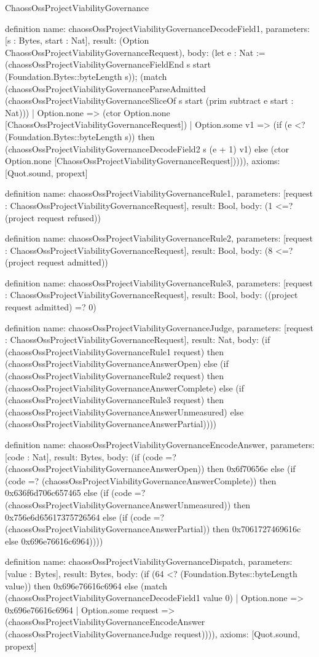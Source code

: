 \begin{lexlean}{ChaossOssProjectViabilityGovernance}
\begin{semanticmodule}
definition{
  name: chaossOssProjectViabilityGovernanceDecodeField1,
  parameters: [s : Bytes, start : Nat],
  result: (Option ChaossOssProjectViabilityGovernanceRequest),
  body: (let e : Nat := (chaossOssProjectViabilityGovernanceFieldEnd s start (Foundation.Bytes::byteLength s)); (match (chaossOssProjectViabilityGovernanceParseAdmitted (chaossOssProjectViabilityGovernanceSliceOf s start (prim subtract e start : Nat)))
    | Option.none => (ctor Option.none [ChaossOssProjectViabilityGovernanceRequest])
    | Option.some v1 => (if (e <? (Foundation.Bytes::byteLength s)) then (chaossOssProjectViabilityGovernanceDecodeField2 s (e + 1) v1) else (ctor Option.none [ChaossOssProjectViabilityGovernanceRequest])))),
  axioms: [Quot.sound, propext]
}

definition{
  name: chaossOssProjectViabilityGovernanceRule1,
  parameters: [request : ChaossOssProjectViabilityGovernanceRequest],
  result: Bool,
  body: (1 <=? (project request refused))
}

definition{
  name: chaossOssProjectViabilityGovernanceRule2,
  parameters: [request : ChaossOssProjectViabilityGovernanceRequest],
  result: Bool,
  body: (8 <=? (project request admitted))
}

definition{
  name: chaossOssProjectViabilityGovernanceRule3,
  parameters: [request : ChaossOssProjectViabilityGovernanceRequest],
  result: Bool,
  body: ((project request admitted) =? 0)
}

definition{
  name: chaossOssProjectViabilityGovernanceJudge,
  parameters: [request : ChaossOssProjectViabilityGovernanceRequest],
  result: Nat,
  body: (if (chaossOssProjectViabilityGovernanceRule1 request) then (chaossOssProjectViabilityGovernanceAnswerOpen) else (if (chaossOssProjectViabilityGovernanceRule2 request) then (chaossOssProjectViabilityGovernanceAnswerComplete) else (if (chaossOssProjectViabilityGovernanceRule3 request) then (chaossOssProjectViabilityGovernanceAnswerUnmeasured) else (chaossOssProjectViabilityGovernanceAnswerPartial))))
}

definition{
  name: chaossOssProjectViabilityGovernanceEncodeAnswer,
  parameters: [code : Nat],
  result: Bytes,
  body: (if (code =? (chaossOssProjectViabilityGovernanceAnswerOpen)) then 0x6f70656e else (if (code =? (chaossOssProjectViabilityGovernanceAnswerComplete)) then 0x636f6d706c657465 else (if (code =? (chaossOssProjectViabilityGovernanceAnswerUnmeasured)) then 0x756e6d65617375726564 else (if (code =? (chaossOssProjectViabilityGovernanceAnswerPartial)) then 0x7061727469616c else 0x696e76616c6964))))
}

definition{
  name: chaossOssProjectViabilityGovernanceDispatch,
  parameters: [value : Bytes],
  result: Bytes,
  body: (if (64 <? (Foundation.Bytes::byteLength value)) then 0x696e76616c6964 else (match (chaossOssProjectViabilityGovernanceDecodeField1 value 0)
    | Option.none => 0x696e76616c6964
    | Option.some request => (chaossOssProjectViabilityGovernanceEncodeAnswer (chaossOssProjectViabilityGovernanceJudge request)))),
  axioms: [Quot.sound, propext]
}
\end{semanticmodule}
\end{lexlean}
